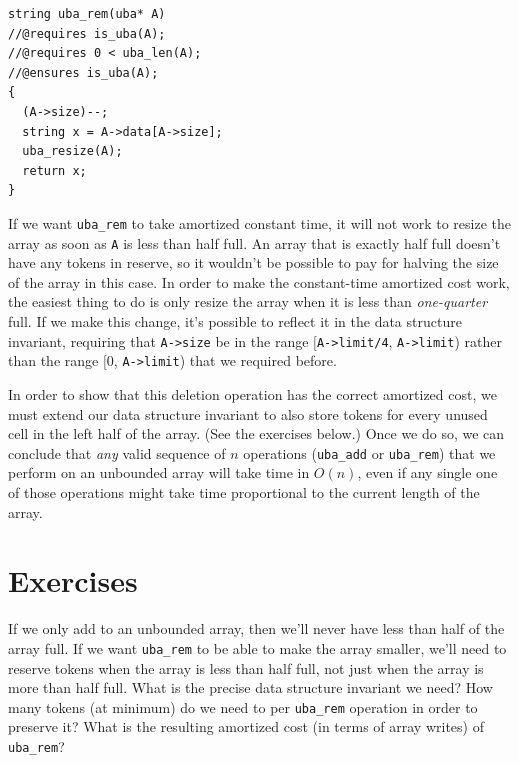 \begin{lstlisting}[language={[C0]C}]
string uba_rem(uba* A)
//@requires is_uba(A);
//@requires 0 < uba_len(A);
//@ensures is_uba(A);
{
  (A->size)--;
  string x = A->data[A->size];
  uba_resize(A);
  return x;
}
\end{lstlisting}

If we want \lstinline'uba_rem' to take amortized constant time, it
will not work to resize the array as soon as \lstinline'A' is less
than half full. An array that is exactly half full doesn't have any
tokens in reserve, so it wouldn't be possible to pay for halving the
size of the array in this case. In order to make the constant-time
amortized cost work, the easiest thing to do is only resize the array
when it is less than \emph{one-quarter} full.  If we make this change,
it's possible to reflect it in the data structure invariant, requiring
that \lstinline'A->size' be in the range $\lbrack $\lstinline'A->limit/4',
\lstinline'A->limit') rather than the range $\lbrack 0$,
\lstinline'A->limit') that we required before.

In order to show that this deletion operation has the correct
amortized cost, we must extend our data structure invariant to also
store tokens for every unused cell in the left half of the array. (See
the exercises below.) Once we do so, we can conclude that \emph{any}
valid sequence of $n$ operations (\lstinline'uba_add' or
\lstinline'uba_rem') that we perform on an unbounded array will take
time in $O(n)$, even if any single one of those operations might take
time proportional to the current length of the array.

\clearpage
\section{Exercises}
\label{sec:ubarrays:exercises}

\begin{exercise}
  If we only add to an unbounded array, then we'll never have less
  than half of the array full. If we want \lstinline'uba_rem' to be
  able to make the array smaller, we'll need to reserve tokens when
  the array is less than half full, not just when the array is more
  than half full. What is the precise data structure invariant we
  need? How many tokens (at minimum) do we need to per
  \lstinline'uba_rem' operation in order to preserve it? What is the
  resulting amortized cost (in terms of array writes) of
  \lstinline'uba_rem'?
\end{exercise}

